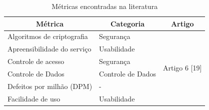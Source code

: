 \documentclass[conference]{IEEEtran}
\begin{document}
\begin{table}[]
\centering
 \caption{Métricas encontradas na literatura}
\label{tab:metricas_literatura}
\begin{tabular}{|l|l|l|}
\hline
\multicolumn{1}{|c|}{\textbf{Métrica}}                                                       & \multicolumn{1}{c|}{\textbf{Categoria}}                                                                    & \multicolumn{1}{c|}{\textbf{Artigo}}                                                    \\ \hline
Algoritmos de criptografia                                                                   & Segurança                                                                                                  & \multirow{9}{*}{Artigo 6 [19]}                                                          \\ \cline{1-2}
Apreensibilidade do serviço                                                                  & Usabilidade                                                                                                &                                                                                         \\ \cline{1-2}
Controle de acesso                                                                           & Segurança                                                                                                  &                                                                                         \\ \cline{1-2}
Controle de Dados                                                                            & Controle de Dados                                                                                          &                                                                                         \\ \cline{1-2}
Defeitos por milhão (DPM)                                                                    & -                                                                                                          &                                                                                         \\ \cline{1-2}
Facilidade de uso                                                                            & Usabilidade                                                                                                &                                                                                         \\ \cline{1-2}

\end{tabular}
\end{table}
\end{document}
